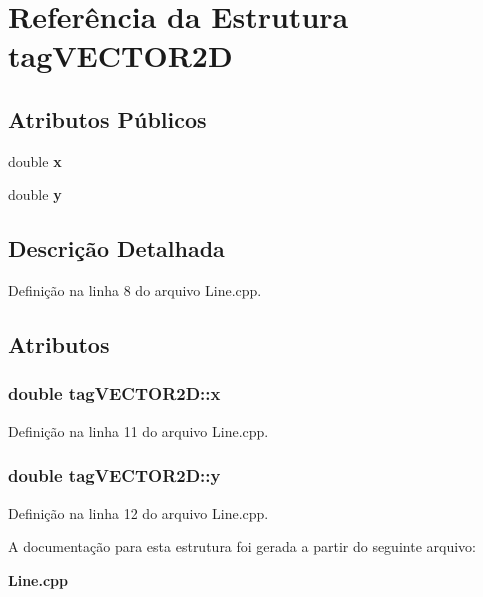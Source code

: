 \section{Referência da Estrutura tag\+V\+E\+C\+T\+O\+R2D}
\label{structtag_v_e_c_t_o_r2_d}
\subsection*{Atributos Públicos}
\begin{DoxyCompactItemize}
\item 
double {\bf x}
\item 
double {\bf y}
\end{DoxyCompactItemize}


\subsection{Descrição Detalhada}


Definição na linha 8 do arquivo Line.\+cpp.



\subsection{Atributos}
\subsubsection[{x}]{\setlength{\rightskip}{0pt plus 5cm}double tag\+V\+E\+C\+T\+O\+R2\+D\+::x}\label{structtag_v_e_c_t_o_r2_d_a264f5ad69c5d7568bffbccb15017de3d}


Definição na linha 11 do arquivo Line.\+cpp.

\subsubsection[{y}]{\setlength{\rightskip}{0pt plus 5cm}double tag\+V\+E\+C\+T\+O\+R2\+D\+::y}\label{structtag_v_e_c_t_o_r2_d_a8d08676a9deb672f5c5de44f7c9f290c}


Definição na linha 12 do arquivo Line.\+cpp.



A documentação para esta estrutura foi gerada a partir do seguinte arquivo\+:\begin{DoxyCompactItemize}
\item 
{\bf Line.\+cpp}\end{DoxyCompactItemize}
